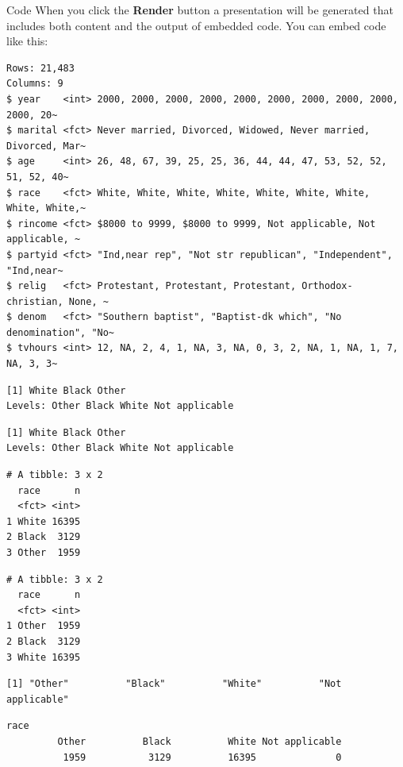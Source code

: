 \documentclass[
  ignorenonframetext,
]{beamer}
\begin{document}
\begin{frame}[fragile]{Code}
\label{code}
When you click the \textbf{Render} button a presentation will be
generated that includes both content and the output of embedded code.
You can embed code like this:

\begin{verbatim}
Rows: 21,483
Columns: 9
$ year    <int> 2000, 2000, 2000, 2000, 2000, 2000, 2000, 2000, 2000, 2000, 20~
$ marital <fct> Never married, Divorced, Widowed, Never married, Divorced, Mar~
$ age     <int> 26, 48, 67, 39, 25, 25, 36, 44, 44, 47, 53, 52, 52, 51, 52, 40~
$ race    <fct> White, White, White, White, White, White, White, White, White,~
$ rincome <fct> $8000 to 9999, $8000 to 9999, Not applicable, Not applicable, ~
$ partyid <fct> "Ind,near rep", "Not str republican", "Independent", "Ind,near~
$ relig   <fct> Protestant, Protestant, Protestant, Orthodox-christian, None, ~
$ denom   <fct> "Southern baptist", "Baptist-dk which", "No denomination", "No~
$ tvhours <int> 12, NA, 2, 4, 1, NA, 3, NA, 0, 3, 2, NA, 1, NA, 1, 7, NA, 3, 3~
\end{verbatim}

\begin{verbatim}
[1] White Black Other
Levels: Other Black White Not applicable
\end{verbatim}

\begin{verbatim}
[1] White Black Other
Levels: Other Black White Not applicable
\end{verbatim}

\begin{verbatim}
# A tibble: 3 x 2
  race      n
  <fct> <int>
1 White 16395
2 Black  3129
3 Other  1959
\end{verbatim}

\begin{verbatim}
# A tibble: 3 x 2
  race      n
  <fct> <int>
1 Other  1959
2 Black  3129
3 White 16395
\end{verbatim}

\begin{verbatim}
[1] "Other"          "Black"          "White"          "Not applicable"
\end{verbatim}

\begin{verbatim}
race
         Other          Black          White Not applicable 
          1959           3129          16395              0 
\end{verbatim}


\end{frame}
\end{document}
